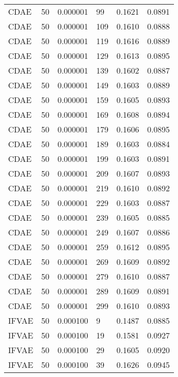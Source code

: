 \begin{tabular}{llrlrr}
    CDAE &   50 &  0.000001 &    99 &  0.1621 &       0.0891 \\
    CDAE &   50 &  0.000001 &   109 &  0.1610 &       0.0888 \\
    CDAE &   50 &  0.000001 &   119 &  0.1616 &       0.0889 \\
    CDAE &   50 &  0.000001 &   129 &  0.1613 &       0.0895 \\
    CDAE &   50 &  0.000001 &   139 &  0.1602 &       0.0887 \\
    CDAE &   50 &  0.000001 &   149 &  0.1603 &       0.0889 \\
    CDAE &   50 &  0.000001 &   159 &  0.1605 &       0.0893 \\
    CDAE &   50 &  0.000001 &   169 &  0.1608 &       0.0894 \\
    CDAE &   50 &  0.000001 &   179 &  0.1606 &       0.0895 \\
    CDAE &   50 &  0.000001 &   189 &  0.1603 &       0.0884 \\
    CDAE &   50 &  0.000001 &   199 &  0.1603 &       0.0891 \\
    CDAE &   50 &  0.000001 &   209 &  0.1607 &       0.0893 \\
    CDAE &   50 &  0.000001 &   219 &  0.1610 &       0.0892 \\
    CDAE &   50 &  0.000001 &   229 &  0.1603 &       0.0887 \\
    CDAE &   50 &  0.000001 &   239 &  0.1605 &       0.0885 \\
    CDAE &   50 &  0.000001 &   249 &  0.1607 &       0.0886 \\
    CDAE &   50 &  0.000001 &   259 &  0.1612 &       0.0895 \\
    CDAE &   50 &  0.000001 &   269 &  0.1609 &       0.0892 \\
    CDAE &   50 &  0.000001 &   279 &  0.1610 &       0.0887 \\
    CDAE &   50 &  0.000001 &   289 &  0.1609 &       0.0891 \\
    CDAE &   50 &  0.000001 &   299 &  0.1610 &       0.0893 \\
   IFVAE &   50 &  0.000100 &     9 &  0.1487 &       0.0885 \\
   IFVAE &   50 &  0.000100 &    19 &  0.1581 &       0.0927 \\
   IFVAE &   50 &  0.000100 &    29 &  0.1605 &       0.0920 \\
   IFVAE &   50 &  0.000100 &    39 &  0.1626 &       0.0945 \\

\end{tabular}
